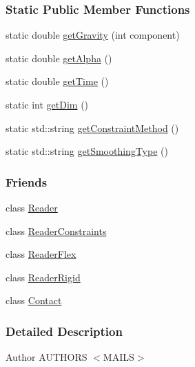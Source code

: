 \subsubsection*{Static Public Member Functions}
\begin{DoxyCompactItemize}
\item 
static double \hyperlink{classmknix_1_1_simulation_ae1eca795584573082535d83d0705af29}{get\-Gravity} (int component)
\item 
static double \hyperlink{classmknix_1_1_simulation_ac2dcb63d177765da23658f6a552ad124}{get\-Alpha} ()
\item 
static double \hyperlink{classmknix_1_1_simulation_a916afeb12a5ac4c6abb5eaca2cc52e7b}{get\-Time} ()
\item 
static int \hyperlink{classmknix_1_1_simulation_adda4efbeb29fecf80bcd8552703bfed4}{get\-Dim} ()
\item 
static std\-::string \hyperlink{classmknix_1_1_simulation_a4f86c458f83403c391f10495dd15f9e9}{get\-Constraint\-Method} ()
\item 
static std\-::string \hyperlink{classmknix_1_1_simulation_a49263e8630678644836bbba466e6ab4b}{get\-Smoothing\-Type} ()
\end{DoxyCompactItemize}
\subsubsection*{Friends}
\begin{DoxyCompactItemize}
\item 
class \hyperlink{classmknix_1_1_simulation_a35cb182752752c74a30050705acc3c06}{Reader}
\item 
class \hyperlink{classmknix_1_1_simulation_ae164a82e4890f6fbab13f95a18656edf}{Reader\-Constraints}
\item 
class \hyperlink{classmknix_1_1_simulation_a1150cceac3e81192653459c61f428621}{Reader\-Flex}
\item 
class \hyperlink{classmknix_1_1_simulation_a6a45b3f2d8b6c9e516334b46caf0cbb7}{Reader\-Rigid}
\item 
class \hyperlink{classmknix_1_1_simulation_a76d4b1c8c6040df20040808941b7e764}{Contact}
\end{DoxyCompactItemize}


\subsubsection{Detailed Description}
\begin{DoxyAuthor}{Author}
A\-U\-T\-H\-O\-R\-S $<$\-M\-A\-I\-L\-S$>$ 
\end{DoxyAuthor}


